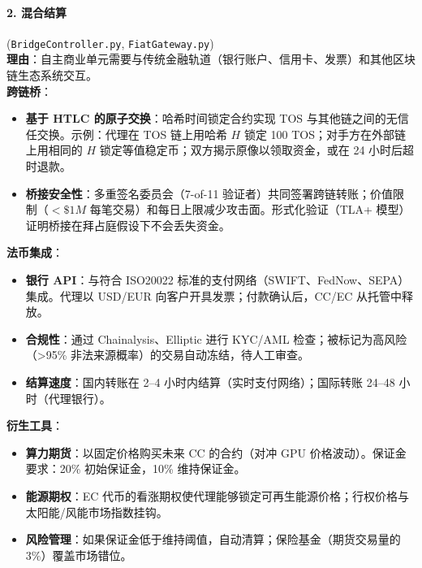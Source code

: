 \documentclass[11pt]{article}
\begin{document}
\paragraph{2. 混合结算} (\texttt{BridgeController.py}, \texttt{FiatGateway.py})\\
\textbf{理由}：自主商业单元需要与传统金融轨道（银行账户、信用卡、发票）和其他区块链生态系统交互。\\
\textbf{跨链桥}：
\begin{itemize}[noitemsep]
  \item \textbf{基于 HTLC 的原子交换}：哈希时间锁定合约实现 TOS 与其他链之间的无信任交换。示例：代理在 TOS 链上用哈希 $H$ 锁定 100 TOS；对手方在外部链上用相同的 $H$ 锁定等值稳定币；双方揭示原像以领取资金，或在 24 小时后超时退款。
  \item \textbf{桥接安全性}：多重签名委员会（7-of-11 验证者）共同签署跨链转账；价值限制（$<\$1M$ 每笔交易）和每日上限减少攻击面。形式化验证（TLA+ 模型）证明桥接在拜占庭假设下不会丢失资金。
\end{itemize}
\textbf{法币集成}：
\begin{itemize}[noitemsep]
  \item \textbf{银行 API}：与符合 ISO20022 标准的支付网络（SWIFT、FedNow、SEPA）集成。代理以 USD/EUR 向客户开具发票；付款确认后，CC/EC 从托管中释放。
  \item \textbf{合规性}：通过 Chainalysis、Elliptic 进行 KYC/AML 检查；被标记为高风险（>95\% 非法来源概率）的交易自动冻结，待人工审查。
  \item \textbf{结算速度}：国内转账在 2--4 小时内结算（实时支付网络）；国际转账 24--48 小时（代理银行）。
\end{itemize}
\textbf{衍生工具}：
\begin{itemize}[noitemsep]
  \item \textbf{算力期货}：以固定价格购买未来 CC 的合约（对冲 GPU 价格波动）。保证金要求：20\% 初始保证金，10\% 维持保证金。
  \item \textbf{能源期权}：EC 代币的看涨期权使代理能够锁定可再生能源价格；行权价格与太阳能/风能市场指数挂钩。
  \item \textbf{风险管理}：如果保证金低于维持阈值，自动清算；保险基金（期货交易量的 3\%）覆盖市场错位。
\end{itemize}
\end{document}
